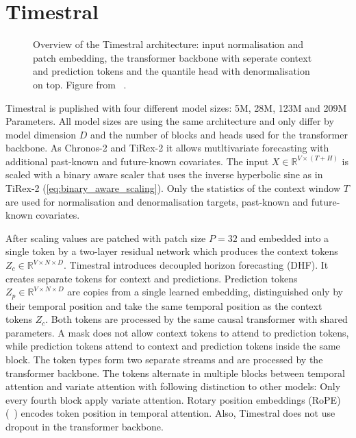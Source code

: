 \section{Timestral}
\label{sec:foundationmodels:timestral}

\begin{figure}[htbp]
	\centering
	
	\caption[Timestral architecture]{Overview of the Timestral architecture:
		input normalisation and patch embedding, the transformer backbone with seperate context and prediction tokens and the quantile head with denormalisation on top.
		Figure from \citeauthor{timestral}~\cite{timestral}.}
	\label{fig:timestral}
\end{figure}

Timestral is puplished with four different model sizes: 5M, 28M, 123M and 209M Parameters. All model sizes are using the same architecture and only differ by model dimension $D$ and the number of blocks and heads used for the transformer backbone. As Chronos-2 and TiRex-2 it allows mutltivariate forecasting with additional past-known and future-known covariates. The input $X \in \mathbb{R}^{V \times (T+H)}$ is scaled with a binary aware scaler that uses the inverse hyperbolic sine as in TiRex-2 (\autoref{eq:binary_aware_scaling}). Only the statistics of the context window $T$ are used for normalisation and denormalisation targets, past-known and future-known covariates. 

After scaling values are patched with patch size $P=32$ and embedded into a single token by a two-layer residual network which produces the context tokens $Z_{c} \in \mathbb{R}^{V \times N \times D}$. Timestral introduces decoupled horizon forecasting (DHF). It creates separate tokens for context and predictions. Prediction tokens $Z_{p} \in \mathbb{R}^{V \times N \times D}$ are copies from a single learned embedding, distinguished only by their temporal position and take the same temporal position as the context tokens $Z_{c}$. Both tokens are processed by the same causal transformer with shared parameters. A mask does not allow context tokens to attend to prediction tokens, while prediction tokens attend to context and prediction tokens inside the same block. The token types form two separate streams and are processed by the transformer backbone. The tokens alternate in multiple blocks between temporal attention and variate attention with following distinction to other models: Only every fourth block apply variate attention. Rotary position embeddings (RoPE) (\citeauthor{rotarypositions}~\cite{rotarypositions}) encodes token position in temporal attention. Also, Timestral does not use dropout in the transformer backbone. 

